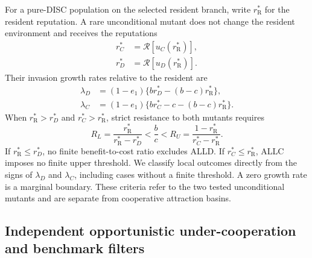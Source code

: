 \documentclass[fleqn,10pt]{article}
\begin{document}
For a pure-DISC population on the selected resident branch, write $r_{\mathrm R}^*$ for the resident reputation. A rare unconditional mutant does not change the resident environment and receives the reputations
\begin{equation}
\begin{aligned}
r_C^*&=\mathcal R\!\left[u_C(r_{\mathrm R}^*)\right],\\
r_D^*&=\mathcal R\!\left[u_D(r_{\mathrm R}^*)\right].
\end{aligned}
\label{eq:methods-classical-mutants}
\end{equation}
Their invasion growth rates relative to the resident are
\begin{equation}
\begin{aligned}
\lambda_D&=(1-e_1)\{br_D^*-(b-c)r_{\mathrm R}^*\},\\
\lambda_C&=(1-e_1)\{br_C^*-c-(b-c)r_{\mathrm R}^*\}.
\end{aligned}
\label{eq:methods-classical-invasion}
\end{equation}
When $r_{\mathrm R}^*>r_D^*$ and $r_C^*>r_{\mathrm R}^*$, strict resistance to both mutants requires
\begin{equation}
R_L=\frac{r_{\mathrm R}^*}{r_{\mathrm R}^*-r_D^*}<\frac bc<
R_U=\frac{1-r_{\mathrm R}^*}{r_C^*-r_{\mathrm R}^*}.
\label{eq:methods-classical-thresholds}
\end{equation}
If $r_{\mathrm R}^*\leq r_D^*$, no finite benefit-to-cost ratio excludes ALLD. If $r_C^*\leq r_{\mathrm R}^*$, ALLC imposes no finite upper threshold. We classify local outcomes directly from the signs of $\lambda_D$ and $\lambda_C$, including cases without a finite threshold. A zero growth rate is a marginal boundary. These criteria refer to the two tested unconditional mutants and are separate from cooperative attraction basins.

\subsection*{Independent opportunistic under-cooperation and benchmark filters}
\end{document}

